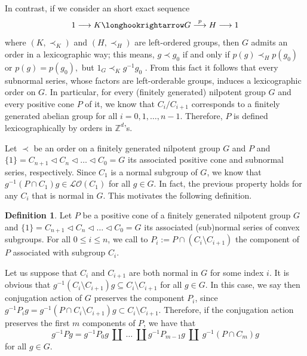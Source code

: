 \documentclass[12pt]{article}
\theoremstyle{definition}
\newtheorem{defi}{Definition}
\begin{document}
In contrast, if we consider an short exact sequence
$$1\longrightarrow K\longhookrightarrow  G\overset{p}\longrightarrow H\longrightarrow 1$$
where $(K,\prec_K)$ and $(H,\prec_{H})$ are left-ordered groups, then $G$ admits an order in a lexicographic way; this means, $g\prec g_0$ if and only if $p(g)\prec_Hp(g_0)$ or $p(g)=p(g_0),$ but $1_G\prec_Kg^{-1}g_0$ \cite[Problem 1.8]{ClayRolfsen}. From this fact it follows that every subnormal series, whose factors are left-orderable groups, induces a lexicographic order on $G$. %
In particular, for every (finitely generated) nilpotent group $G$ and every positive cone $P$ of it, we know that $C_{i}/C_{i+1}$ corresponds to a finitely generated abelian group for all $i=0,1,\dots, n-1$. Therefore, $P$ is defined lexicographically by orders in $\mathbb{Z}^d$'s.

Let $\prec$ be an order on a finitely generated nilpotent group $G$ and $P$ and $\{1\}=C_{n+1}\vartriangleleft C_n\vartriangleleft \dots \vartriangleleft C_0=G$ its associated positive cone and subnormal series, respectively. Since $C_1$ is a normal subgroup of $G$, we know that $g^{-1}(P\cap C_1)g\in \mathcal{LO}(C_1)$ for all $g\in G$. In fact, the previous property holds for any $C_i$ that is normal in $G$.
This motivates the following definition.

\begin{defi}
Let $P$ be a positive cone of a finitely generated nilpotent group $G$ and $\{1\}=C_{n+1}\vartriangleleft C_n\vartriangleleft \dots \vartriangleleft C_0=G$ its associated (sub)normal series of convex subgroups. For all $0\leq i\leq n$, we call to $P_i:=P\cap (C_i\setminus C_{i+1})$ the component of $P$ associated with subgroup $C_i$.
\end{defi}

Let us suppose that $C_i$ and $C_{i+1}$ are both normal in $G$ for some index $i$. It is obvious that $g^{-1}(C_i\setminus C_{i+1})g\subseteq C_i\setminus C_{i+1}$ for all $g\in G$. 
In this case, we say then conjugation action of $G$ preserves the component $P_i$, since $g^{-1}P_ig=g^{-1}(P\cap C_i\setminus C_{i+1})g\subset C_i\setminus C_{i+1}.$
Therefore, if the conjugation action preserves the first $m$ components of $P$, we have that
\begin{equation}
\label{equation1}
g^{-1}Pg=g^{-1}P_0g\ \amalg\ \dots\ \amalg g^{-1}P_{m-1}g\ \amalg\ g^{-1}(P\cap C_m)g  
\end{equation}
for all $g\in G$.
\end{document}
